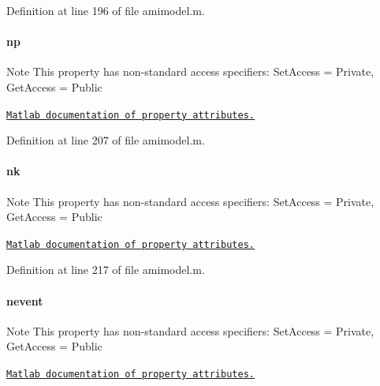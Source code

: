 Definition at line 196 of file amimodel.\+m.

\hypertarget{classamimodel_a6f6e2fe71b05c4c2f2d967ce9ca02dfd}{}
\paragraph[{np}]{\setlength{\rightskip}{0pt plus 5cm}np}\label{classamimodel_a6f6e2fe71b05c4c2f2d967ce9ca02dfd}
\begin{DoxyNote}{Note}
This property has non-\/standard access specifiers\+: {\ttfamily Set\+Access = Private, Get\+Access = Public} 

\href{http://www.mathworks.com/help/matlab/matlab_oop/property-attributes.html}{\tt Matlab documentation of property attributes.} 
\end{DoxyNote}


Definition at line 207 of file amimodel.\+m.

\hypertarget{classamimodel_afd6bea572754e0c3c320664bdccf0200}{}
\paragraph[{nk}]{\setlength{\rightskip}{0pt plus 5cm}nk}\label{classamimodel_afd6bea572754e0c3c320664bdccf0200}
\begin{DoxyNote}{Note}
This property has non-\/standard access specifiers\+: {\ttfamily Set\+Access = Private, Get\+Access = Public} 

\href{http://www.mathworks.com/help/matlab/matlab_oop/property-attributes.html}{\tt Matlab documentation of property attributes.} 
\end{DoxyNote}


Definition at line 217 of file amimodel.\+m.

\hypertarget{classamimodel_aab5c7f06273122b68624eb3bca6a9b6e}{}
\paragraph[{nevent}]{\setlength{\rightskip}{0pt plus 5cm}nevent}\label{classamimodel_aab5c7f06273122b68624eb3bca6a9b6e}
\begin{DoxyNote}{Note}
This property has non-\/standard access specifiers\+: {\ttfamily Set\+Access = Private, Get\+Access = Public} 

\href{http://www.mathworks.com/help/matlab/matlab_oop/property-attributes.html}{\tt Matlab documentation of property attributes.} 
\end{DoxyNote}


